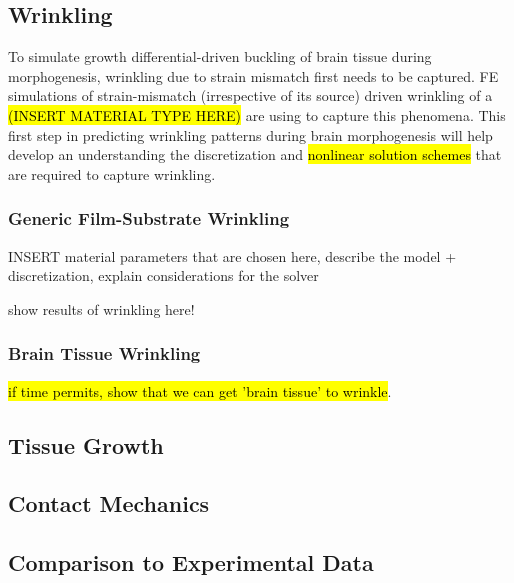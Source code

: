 \documentclass{article}
\begin{document}
\subsection{Wrinkling}
To simulate growth differential-driven buckling of brain tissue during morphogenesis, wrinkling due to strain mismatch first needs to be captured. FE simulations of strain-mismatch (irrespective of its source) driven wrinkling of a \hl{(INSERT MATERIAL TYPE HERE)} are using to capture this phenomena. This first step in predicting wrinkling patterns during brain morphogenesis will help develop an understanding the discretization and \hl{nonlinear solution schemes} that are required to capture wrinkling.

\subsubsection{Generic Film-Substrate Wrinkling}
INSERT material parameters that are chosen here, describe the model + discretization, explain considerations for the solver

show results of wrinkling here!

\subsubsection{Brain Tissue Wrinkling}
\hl{if time permits, show that we can get 'brain tissue' to wrinkle}.
\subsection{Tissue Growth}

\subsection{Contact Mechanics}

\subsection{Comparison to Experimental Data}
\end{document}

